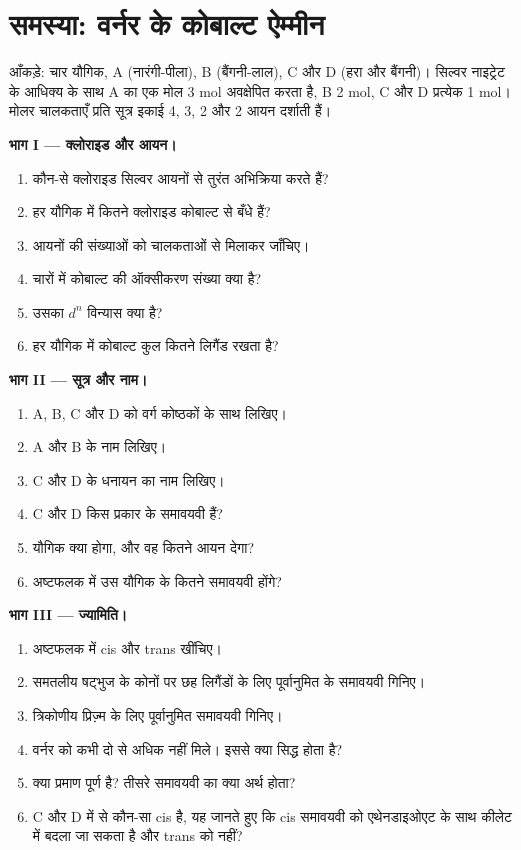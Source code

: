 \section{समस्या: वर्नर के कोबाल्ट ऐम्मीन}

\begin{problem}
\label{pb:b2:coordination-complexes:1}
आँकड़े: चार यौगिक, A  (नारंगी-पीला), B 
(बैंगनी-लाल), C और D  (हरा और बैंगनी)। सिल्वर नाइट्रेट के आधिक्य के साथ
A का एक मोल 3 mol  अवक्षेपित करता है, B 2 mol, C और D प्रत्येक 1 mol। मोलर
चालकताएँ प्रति सूत्र इकाई 4, 3, 2 और 2 आयन दर्शाती हैं।

\medskip
\noindent\textbf{भाग I --- क्लोराइड और आयन।}
\begin{enumerate}
  \item कौन-से क्लोराइड सिल्वर आयनों से तुरंत अभिक्रिया करते हैं?
  \item हर यौगिक में कितने क्लोराइड कोबाल्ट से बँधे हैं?
  \item आयनों की संख्याओं को चालकताओं से मिलाकर जाँचिए।
  \item चारों में कोबाल्ट की ऑक्सीकरण संख्या क्या है?
  \item उसका $d^n$ विन्यास क्या है?
  \item हर यौगिक में कोबाल्ट कुल कितने लिगैंड रखता है?
\end{enumerate}

\medskip
\noindent\textbf{भाग II --- सूत्र और नाम।}
\begin{enumerate}[resume]
  \item A, B, C और D को वर्ग कोष्ठकों के साथ लिखिए।
  \item A और B के नाम लिखिए।
  \item C और D के धनायन का नाम लिखिए।
  \item C और D किस प्रकार के समावयवी हैं?
  \item यौगिक  क्या होगा, और वह कितने आयन देगा?
  \item अष्टफलक में उस यौगिक के कितने समावयवी होंगे?
\end{enumerate}

\medskip
\noindent\textbf{भाग III --- ज्यामिति।}
\begin{enumerate}[resume]
  \item अष्टफलक में cis और trans \ce{[CoCl2(NH3)4]+} खींचिए।
  \item समतलीय षट्भुज के कोनों पर छह लिगैंडों के लिए पूर्वानुमित
        \ce{[CoCl2(NH3)4]+} के समावयवी गिनिए।
  \item त्रिकोणीय प्रिज़्म के लिए पूर्वानुमित समावयवी गिनिए।
  \item वर्नर को कभी दो से अधिक नहीं मिले। इससे क्या सिद्ध होता है?
  \item क्या प्रमाण पूर्ण है? तीसरे समावयवी का क्या अर्थ होता?
  \item C और D में से कौन-सा cis है, यह जानते हुए कि cis समावयवी को एथेनडाइओएट के साथ
        कीलेट में बदला जा सकता है और trans को नहीं?
\end{enumerate}


\end{problem}
